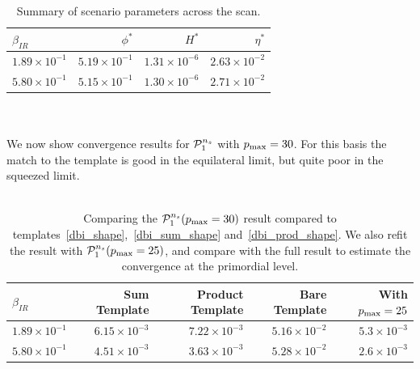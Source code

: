     \\
    \\
\begin{table}[h!]
  \begin{center}
    \begin{tabular}{lrrr}
        \toprule
        $\beta_{IR}$ &  $\phi^{*}$ &     $H^{*}$ &   $\eta^{*}$ \\
        \midrule
        $1.89\times 10^{-1}$  &  $5.19\times 10^{-1}$  &  $1.31\times 10^{-6}$  &  $2.63\times 10^{-2}$ \\
        $5.80\times 10^{-1}$  &  $5.15\times 10^{-1}$  &  $1.30\times 10^{-6}$  &  $2.71\times 10^{-2}$ \\
        \bottomrule
    \end{tabular}
    \caption{Summary of scenario parameters across the scan.}\label{tab:scan_summary2}
  \end{center}
\end{table}
    \\
    \\
    We now show convergence results for $\mathcal{P}^{n_s}_1$ with $p_\text{max}=30$.
    For this basis the match to the template is good in the equilateral limit, but quite poor in the squeezed limit.
    \\
    \\
\begin{table}[h!]
  \begin{center}
    \begin{tabular}{lrrrr}
        \toprule
        $\beta_{IR}$ & Sum Template & Product Template & Bare Template & With $p_\text{max}=25$ \\
        \midrule
        $1.89\times 10^{-1}$  &  $6.15\times 10^{-3}$  &  $7.22\times 10^{-3}$  &  $5.16\times 10^{-2}$  &  $5.3\times 10^{-3}$ \\
        $5.80\times 10^{-1}$  &  $4.51\times 10^{-3}$  &  $3.63\times 10^{-3}$  &  $5.28\times 10^{-2}$  &  $2.6\times 10^{-3}$ \\
        \bottomrule
    \end{tabular}
    \caption{
        Comparing the $\mathcal{P}^{n_s}_1(p_\text{max}=30)$ result compared to
        templates~\eqref{dbi_shape},~\eqref{dbi_sum_shape} and~\eqref{dbi_prod_shape}.
        We also refit the result with $\mathcal{P}^{n_s}_1(p_\text{max}=25)$, and compare with the full
        result to estimate the convergence at the primordial level.
    }\label{fig:template_errors}
  \end{center}
\end{table}
    \\
